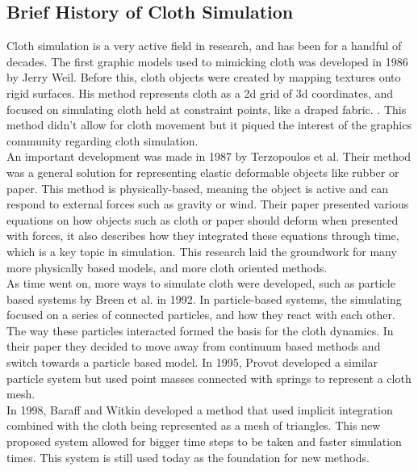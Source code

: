 \documentclass[12pt,a4paper]{article}
\begin{document}
\subsection{Brief History of Cloth Simulation}
\label{History}
Cloth simulation is a very active field in research, and has been for a handful of decades. The first graphic models used to mimicking cloth was developed in 1986 by Jerry Weil. Before this, cloth objects were created by mapping textures onto rigid surfaces. His method represents cloth as a 2d grid of 3d coordinates, and focused on simulating cloth held at constraint points, like a draped fabric. \cite{weil_synthesis_1986}. This method didn't allow for cloth movement but it piqued the interest of the graphics community regarding cloth simulation. \\

An important development was made in 1987 by Terzopoulos et al. Their method was a general solution for representing elastic deformable objects like rubber or paper. This method is physically-based, meaning the object is active and can respond to external forces such as gravity or wind. Their paper presented various equations on how objects such as cloth or paper should deform when presented with forces, it also describes how they integrated these equations through time, which is a key topic in simulation. This research laid the groundwork for many more physically based models, and more cloth oriented methods. \cite{terzopoulos1987elastically} \\

As time went on, more ways to simulate cloth were developed, such as particle based systems by Breen et al. in 1992. In particle-based systems, the simulating focused on a series of connected particles, and how they react with each other. The way these particles interacted formed the basis for the cloth dynamics. \cite{breen1992physically} In their paper they decided to move away from continuum based methods and switch towards a particle based model. In 1995, Provot developed a similar particle system but used point masses connected with springs to represent a cloth mesh. \cite{provot1995deformation} \\

In 1998, Baraff and Witkin developed a method that used implicit integration combined with the cloth being represented as a mesh of triangles. This new proposed system allowed for bigger time steps to be taken and faster simulation times. This system is still used today as the foundation for new methods. \cite{Baraff1998largesteps} \\
\end{document}
